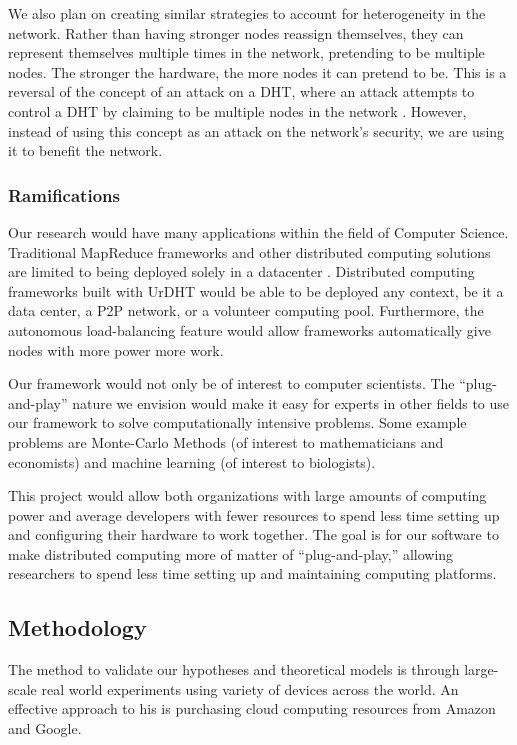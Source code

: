 \documentclass[12pt,a4paper]{article}
\begin{document}
We also plan on creating similar strategies to account for heterogeneity in the network.
Rather than having stronger nodes reassign themselves, they can represent themselves multiple times in the network, pretending to be multiple nodes.
The stronger the hardware, the more nodes it can pretend to be.
This is a reversal of the concept of an attack on a DHT, where an attack attempts to control a DHT by claiming to be multiple nodes in the network \cite{sybil}.
However, instead of using this concept as an attack on the network's security, we are using it to benefit the network.



\subsubsection*{Ramifications}
Our research would have many applications within the field of Computer Science.
Traditional MapReduce frameworks and other distributed computing solutions are limited to being deployed solely in a datacenter \cite{hadoopAssumptions}.
Distributed computing frameworks built with UrDHT would be able to be deployed any context, be it a data center, a P2P network, or a volunteer computing pool.
Furthermore, the autonomous load-balancing feature would allow frameworks automatically give nodes with more power more work.

Our framework would not only be of interest to computer scientists.
The ``plug-and-play'' nature we envision would make it easy for experts in other fields to use our framework to solve computationally intensive problems.
Some example problems are Monte-Carlo Methods (of interest to mathematicians and economists) and machine learning (of interest to biologists).

This project would allow both organizations with large amounts of computing power and average developers with  fewer resources to spend less time setting up and configuring their hardware to work together.  
The goal is for our software to make distributed computing more of matter of ``plug-and-play,'' allowing researchers to spend less time setting up and maintaining  computing platforms.

\subsection*{Methodology}

The method to validate our hypotheses and theoretical models is through large-scale real world experiments using variety of devices across the world.
An effective approach to his is purchasing cloud computing resources from Amazon and Google.
\end{document}
